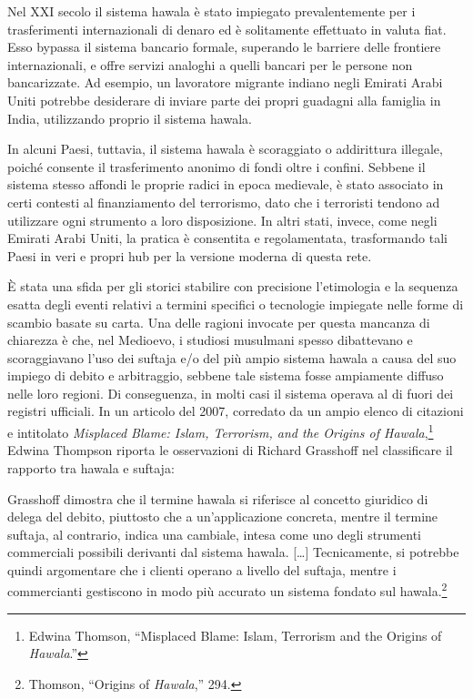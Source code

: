 \documentclass[
  a5paper,
  smalldemyvopaper,10pt,twoside,onecolumn,openright,extrafontsizes,hidelinks]{memoir}
\renewenvironment{quote}%
               {\list{}{\rightmargin=.6cm\leftmargin=.6cm}%
                \itshape \item[]}%
               {\endlist}
\begin{document}
Nel XXI secolo il sistema hawala è stato impiegato prevalentemente per i
trasferimenti internazionali di denaro ed è solitamente effettuato in
valuta fiat. Esso bypassa il sistema bancario formale, superando le
barriere delle frontiere internazionali, e offre servizi analoghi a
quelli bancari per le persone non bancarizzate. Ad esempio, un
lavoratore migrante indiano negli Emirati Arabi Uniti potrebbe
desiderare di inviare parte dei propri guadagni alla famiglia in India,
utilizzando proprio il sistema hawala.

In alcuni Paesi, tuttavia, il sistema hawala è scoraggiato o addirittura
illegale, poiché consente il trasferimento anonimo di fondi oltre i
confini. Sebbene il sistema stesso affondi le proprie radici in epoca
medievale, è stato associato in certi contesti al finanziamento del
terrorismo, dato che i terroristi tendono ad utilizzare ogni strumento a
loro disposizione. In altri stati, invece, come negli Emirati Arabi
Uniti, la pratica è consentita e regolamentata, trasformando tali Paesi
in veri e propri hub per la versione moderna di questa rete.

È stata una sfida per gli storici stabilire con precisione l'etimologia
e la sequenza esatta degli eventi relativi a termini specifici o
tecnologie impiegate nelle forme di scambio basate su carta. Una delle
ragioni invocate per questa mancanza di chiarezza è che, nel Medioevo, i
studiosi musulmani spesso dibattevano e scoraggiavano l'uso dei suftaja
e/o del più ampio sistema hawala a causa del suo impiego di debito e
arbitraggio, sebbene tale sistema fosse ampiamente diffuso nelle loro
regioni. Di conseguenza, in molti casi il sistema operava al di fuori
dei registri ufficiali. In un articolo del 2007, corredato da un ampio
elenco di citazioni e intitolato \emph{Misplaced Blame: Islam,
Terrorism, and the Origins of Hawala},\footnote{Edwina Thomson,
  ``Misplaced Blame: Islam, Terrorism and the Origins of
  \emph{Hawala}.''} Edwina Thompson riporta le osservazioni di Richard
Grasshoff nel classificare il rapporto tra hawala e suftaja:

\begin{quote}
Grasshoff dimostra che il termine hawala si riferisce al concetto
giuridico di delega del debito, piuttosto che a un'applicazione
concreta, mentre il termine suftaja, al contrario, indica una cambiale,
intesa come uno degli strumenti commerciali possibili derivanti dal
sistema hawala. {[}\ldots{]} Tecnicamente, si potrebbe quindi
argomentare che i clienti operano a livello del suftaja, mentre i
commercianti gestiscono in modo più accurato un sistema fondato sul
hawala.\footnote{Thomson, ``Origins of \emph{Hawala},'' 294.}
\end{quote}
\end{document}
